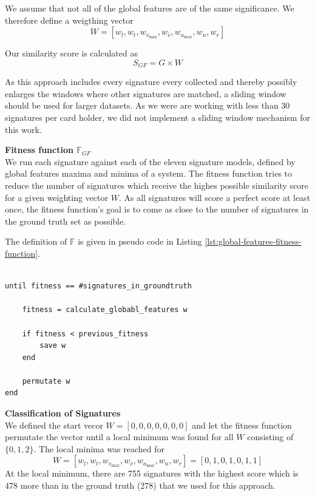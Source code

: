 \documentclass[a4paper, oneside]{csthesis}
\begin{document}
We assume that not all of the global features are of the same significance. We therefore define a  weigthing vector $$W = [w_l, w_t, w_{v_\text{max}}, w_{\bar{v}}, w_{a_\text{max}}, w_n, w_r]$$

Our similarity score is calculated as
$$S_{GF} = G \times W$$

As this approach includes every signature every collected and thereby possibly enlarges the windows where other signatures are matched, a sliding window should be used for larger datasets. As we were are working with less than 30 signatures per card holder, we did not implement a sliding window mechanism for this work.

\textbf{Fitness function $\mathbb{F}_{GF}$}\\
We run each signature against each of the eleven signature models, defined by global features maxima and minima of a system. The fitness function tries to reduce the number of signatures which receive the highes possible similarity score for a given weighting vector $W$.
As all signatures will score a perfect score at least once, the fitness function's goal is to come as close to the number of signatures in the ground truth set as possible.

The definition of $\mathbb{F}$ is given in pseudo code in Listing \ref{lst:global-features-fitness-function}.


\begin{lstlisting}[caption={The fitness function for global features tries to reduce the number of signatures with the hightes possible score for a given weighting vector $W$},label={lst:global-features-fitness-function}]

until fitness == #signatures_in_groundtruth

    fitness = calculate_globabl_features w

    if fitness < previous_fitness
        save w
    end

    permutate w
end
\end{lstlisting}


\textbf{Classification of Signatures}\\
We defined the start vecor $W = [0,0,0,0,0,0,0]$ and let the fitness function permutate the vector until a local minimum was found for all $W$ consisting of $\{0,1,2\}$. The local minima was reached for $$W = [w_l, w_t, w_{v_\text{max}}, w_{\bar{v}}, w_{a_\text{max}}, w_n, w_r] = [0, 1, 0, 1, 0, 1, 1]$$
At the local minimum, there are 755 signatures with the highest score which is 478 more than in the ground truth (278) that we used for this approach.
\end{document}
